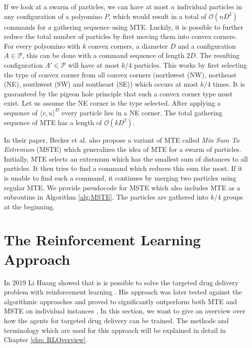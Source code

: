 If we look at a swarm of particles, we can have at most $n$ individual particles in any configuration of a polyomino $P$, which would result in a total of $\mathcal{O}(nD^2)$ commands for a gathering sequence using MTE. Luckily, it is possible to further reduce the total number of particles by first moving them into convex corners. For every polyomino with $k$ convex corners, a diameter $D$ and a configuration $A \in \mathcal{P}$, this can be done with a command sequence of length $2D$. The resulting configuration $A' \in \mathcal{P}$ will have at most $k/4$ particles. This works by first selecting the type of convex corner from all convex corners (northwest (NW), northeast (NE), southwest (SW) and southeast (SE)) which occurs at most $k/4$ times. It is guaranteed by the pigeon hole principle that such a convex corner type must exist. Let us assume the NE corner is the type selected. After applying a sequence of $\langle r, u \rangle^D$ every particle lies in a NE corner. The total gathering sequence of MTE has a length of $\mathcal{O}(kD^2)$. 

In their paper, Becker et al. also propose a variant of MTE called \textit{Min Sum To Extremum} (MSTE) which generalizes the idea of MTE for a swarm of particles. Initially, MTE selects an extremum which has the smallest sum of distances to all particles. It then tries to find a command which reduces this sum the most. If it is unable to find such a command, it continues by merging two particles using regular MTE. We provide pseudocode for MSTE which also includes MTE as a subroutine in Algorithm \ref{alg:MSTE}. The particles are gathered into $k/4$ groups at the beginning.

\section{The Reinforcement Learning Approach} \label{sec:TDDRL}
In 2019 Li Huang showed that is is possible to solve the targeted drug delivery problem with reinforcement learning \cite{huang2019}. His approach was later tested against the algorithmic approaches and proved to significantly outperform both MTE and MSTE on individual instances \cite{becker2020}. In this section, we want to give an overview over how the agents for targeted drug delivery can be trained. The methods and terminology which are used for this approach will be explained in detail in Chapter \ref{chp: RLOverview}.

